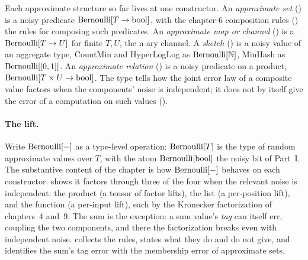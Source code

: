 Each approximate structure so far lives at one constructor. An
\emph{approximate set} () is a noisy predicate
$\mathrm{Bernoulli}[T \to \mathrm{bool}]$, with the chapter-6 composition rules
() the rules for composing such predicates. An
\emph{approximate map or channel} () is a
$\mathrm{Bernoulli}[T \to U]$ for finite $T, U$, the n-ary channel. A \emph{sketch}
() is a noisy value of an aggregate type, CountMin
and HyperLogLog as $\mathrm{Bernoulli}[\mathbb{N}]$, MinHash as $\mathrm{Bernoulli}[[0,1]]$. An
\emph{approximate relation}
() is a noisy
predicate on a product, $\mathrm{Bernoulli}[T \times U \to \mathrm{bool}]$. The type tells
how the joint error law of a composite value factors when the components' noise
is independent; it does not by itself give the error of a computation on such
values ().

\paragraph{The lift.}
Write $\mathrm{Bernoulli}[-]$ as a type-level operation: $\mathrm{Bernoulli}[T]$ is the type of
random approximate values over $T$, with the atom $\mathrm{Bernoulli}[\mathrm{bool}]$ the
noisy bit of Part~I. The substantive content of the chapter is how
$\mathrm{Bernoulli}[-]$ behaves on each constructor.
 shows it factors through three of the four
when the relevant noise is independent: the product (a tensor of factor lifts),
the list (a per-position lift), and the function (a per-input lift), each by the
Kronecker factorization of chapters~4 and~9. The sum is the exception: a sum
value's \emph{tag} can itself err, coupling the two components, and there the
factorization breaks even with independent noise.
 collects the rules, states what they do and do
not give, and identifies the sum's tag error with the membership error of
approximate sets.
